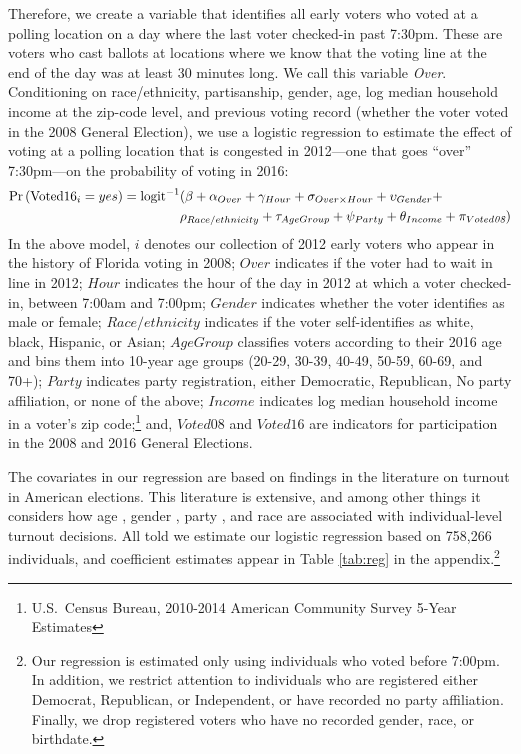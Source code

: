 \documentclass[12pt,titlepage]{article}
\begin{document}
Therefore, we create a variable that identifies all early voters who
voted at a polling location on a day where the last voter checked-in
past 7:30pm.  These are voters who cast ballots at locations where we
know that the voting line at the end of the day was at least 30
minutes long.  We call this variable \emph{Over}.  Conditioning on
race/ethnicity, partisanship, gender, age, log median household income
at the zip-code level, and previous voting record (whether the voter
voted in the 2008 General Election), we use a logistic regression to
estimate the effect of voting at a polling location that is congested
in 2012---one that goes ``over'' 7:30pm---on the probability of voting
in 2016:
\begin{equation*}
  \begin{aligned}
    \textup{Pr}\left(\mathrm{Voted16}_{i} = yes\right) =  \textup{logit}^{-1}&(\beta + \alpha_{Over} + \gamma_{Hour} +
    \sigma_{Over \times Hour} + \upsilon_{Gender}  + \\& \rho_{Race/ethnicity} +
      \tau_{Age Group} + \psi_{Party} + \theta_{Income} + \pi_{Voted\emph{08}})
  \end{aligned}  
\end{equation*}
%
In the above model, $i$ denotes our collection of 2012 early voters
who appear in the history of Florida voting in 2008; $Over$ indicates
if the voter had to wait in line in 2012; $Hour$ indicates the hour of
the day in 2012 at which a voter checked-in, between 7:00am and
7:00pm; $Gender$ indicates whether the voter identifies as male or
female; $Race/ethnicity$ indicates if the voter self-identifies as
white, black, Hispanic, or Asian; $Age Group$ classifies voters
according to their 2016 age and bins them into 10-year age groups
(20-29, 30-39, 40-49, 50-59, 60-69, and 70+); $Party$ indicates party
registration, either Democratic, Republican, No party affiliation, or
none of the above; $Income$ indicates log median household income in a
voter's zip code;\footnote{U.S.\ Census Bureau, 2010-2014 American
  Community Survey 5-Year Estimates} and, $Voted08$ and $Voted16$ are
indicators for participation in the 2008 and 2016 General Elections.

The covariates in our regression are based on findings in the
literature on turnout in American elections.  This literature is
extensive, and among other things it considers how age
\cite{strateetal:age,hightonwolfinger:lifecycle}, gender
\cite{schlozman:genderdifferentvoice}, party
\cite{martinezgill:partisanturnout,grofmanetal:turnout}, and race
\cite{verbaetal:raceparticipation,fraga:raceturnout} are associated
with individual-level turnout decisions.  All told we estimate our
logistic regression based on 758,266 individuals, and coefficient
estimates appear in Table \ref{tab:reg} in the appendix.\footnote{Our
  regression is estimated only using individuals who voted before
  7:00pm.  In addition, we restrict attention to individuals who are
  registered either Democrat, Republican, or Independent, or have
  recorded no party affiliation.  Finally, we drop registered voters
  who have no recorded gender, race, or birthdate.}
\end{document}
